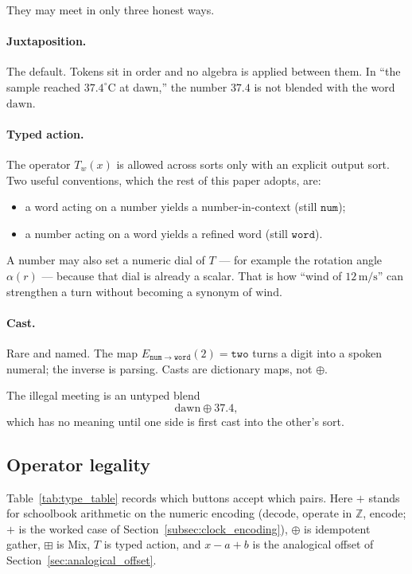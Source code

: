 \documentclass[12pt, a4paper]{article}
\begin{document}
They may meet in only three honest ways.

\paragraph{Juxtaposition.}
The default. Tokens sit in order and no algebra is applied between
them. In ``the sample reached $37.4^\circ\mathrm{C}$ at dawn,'' the
number $37.4$ is not blended with the word $\mathrm{dawn}$.

\paragraph{Typed action.}
The operator $T_w(x)$ is allowed across sorts only with an explicit
output sort. Two useful conventions, which the rest of this paper
adopts, are:
\begin{itemize}
    \item a word acting on a number yields a number-in-context
          (still $\mathtt{num}$);
    \item a number acting on a word yields a refined word
          (still $\mathtt{word}$).
\end{itemize}
A number may also set a numeric dial of $T$ --- for example the
rotation angle $\alpha(r)$ --- because that dial is already a scalar.
That is how ``wind of $12\,\mathrm{m/s}$'' can strengthen a turn
without becoming a synonym of $\mathrm{wind}$.

\paragraph{Cast.}
Rare and named. The map $E_{\mathtt{num}\to\mathtt{word}}(2)=\texttt{two}$
turns a digit into a spoken numeral; the inverse is parsing. Casts are
dictionary maps, not $\oplus$.

The illegal meeting is an untyped blend
\begin{equation}
    \mathrm{dawn} \oplus 37.4,
\end{equation}
which has no meaning until one side is first cast into the other's
sort.

\subsection{Operator legality}
\label{subsec:type_table}
Table~\ref{tab:type_table} records which buttons accept which pairs.
Here $+$ stands for schoolbook arithmetic on the numeric encoding
(decode, operate in $\mathbb{Z}$, encode; $+$ is the worked case of
Section~\ref{subsec:clock_encoding}), $\oplus$ is
idempotent gather, $\boxplus$ is Mix, $T$ is typed action, and $x-a+b$ is the analogical
offset of Section~\ref{sec:analogical_offset}.
\end{document}
